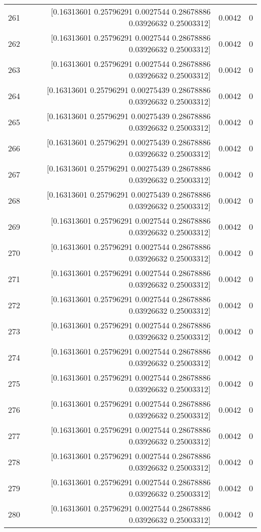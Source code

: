 \begin{longtable}{lrrr}
261 & [0.16313601 0.25796291 0.0027544  0.28678886 0.03926632 0.25003312] & 0.0042 & 0 \\
262 & [0.16313601 0.25796291 0.0027544  0.28678886 0.03926632 0.25003312] & 0.0042 & 0 \\
263 & [0.16313601 0.25796291 0.0027544  0.28678886 0.03926632 0.25003312] & 0.0042 & 0 \\
264 & [0.16313601 0.25796291 0.00275439 0.28678886 0.03926632 0.25003312] & 0.0042 & 0 \\
265 & [0.16313601 0.25796291 0.00275439 0.28678886 0.03926632 0.25003312] & 0.0042 & 0 \\
266 & [0.16313601 0.25796291 0.00275439 0.28678886 0.03926632 0.25003312] & 0.0042 & 0 \\
267 & [0.16313601 0.25796291 0.00275439 0.28678886 0.03926632 0.25003312] & 0.0042 & 0 \\
268 & [0.16313601 0.25796291 0.00275439 0.28678886 0.03926632 0.25003312] & 0.0042 & 0 \\
269 & [0.16313601 0.25796291 0.0027544  0.28678886 0.03926632 0.25003312] & 0.0042 & 0 \\
270 & [0.16313601 0.25796291 0.0027544  0.28678886 0.03926632 0.25003312] & 0.0042 & 0 \\
271 & [0.16313601 0.25796291 0.0027544  0.28678886 0.03926632 0.25003312] & 0.0042 & 0 \\
272 & [0.16313601 0.25796291 0.0027544  0.28678886 0.03926632 0.25003312] & 0.0042 & 0 \\
273 & [0.16313601 0.25796291 0.0027544  0.28678886 0.03926632 0.25003312] & 0.0042 & 0 \\
274 & [0.16313601 0.25796291 0.0027544  0.28678886 0.03926632 0.25003312] & 0.0042 & 0 \\
275 & [0.16313601 0.25796291 0.0027544  0.28678886 0.03926632 0.25003312] & 0.0042 & 0 \\
276 & [0.16313601 0.25796291 0.0027544  0.28678886 0.03926632 0.25003312] & 0.0042 & 0 \\
277 & [0.16313601 0.25796291 0.0027544  0.28678886 0.03926632 0.25003312] & 0.0042 & 0 \\
278 & [0.16313601 0.25796291 0.0027544  0.28678886 0.03926632 0.25003312] & 0.0042 & 0 \\
279 & [0.16313601 0.25796291 0.0027544  0.28678886 0.03926632 0.25003312] & 0.0042 & 0 \\
280 & [0.16313601 0.25796291 0.0027544  0.28678886 0.03926632 0.25003312] & 0.0042 & 0 \\

\end{longtable}

